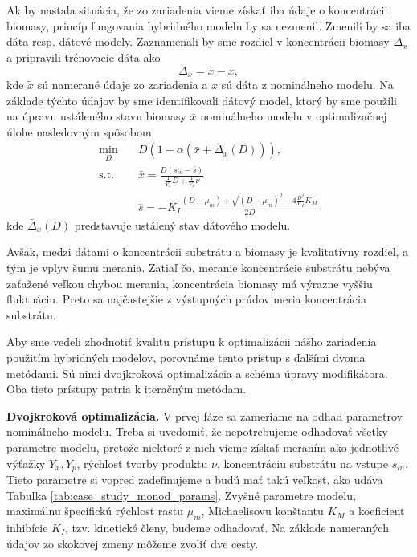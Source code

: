 Ak by nastala situácia, že zo zariadenia vieme získať iba údaje o koncentrácii biomasy, princíp fungovania hybridného modelu by sa nezmenil. Zmenili by sa iba dáta resp. dátové modely. Zaznamenali by sme rozdiel v koncentrácii biomasy $ \Delta_{x} $ a pripravili trénovacie dáta ako
\begin{equation}
	\Delta_{x} = \tilde{x} - x,
\end{equation} 
kde $ \tilde{x} $ sú namerané údaje zo zariadenia a $ x $ sú dáta z nominálneho modelu. Na základe týchto údajov by sme identifikovali dátový model, ktorý by sme použili na úpravu ustáleného stavu biomasy $ \bar{x} $ nominálneho modelu v optimalizačnej úlohe nasledovným spôsobom
\begin{equation}
\label{eq:hybrid_opt_bio}
	\begin{split}
		\min_{D} &\quad D\left(1-\alpha\left(\bar{x}+\bar{\Delta}_{x}(D)\right)\right), \\
		\text{s.t.} &\quad \bar{x} = \frac{D\left(s_{in}-\bar{s}\right)}{\frac{1}{Y_{x}}D + \frac{1}{Y_{x}}\nu} \\
		&\quad \bar{s} = -K_{I}\frac{\left(D-\mu_{m}\right) + \sqrt{\left(D-\mu_{m}\right)^2 - 4\frac{D^2}{K_{I}}K_{M}}}{2D}
	\end{split}
\end{equation}
kde $ \bar{\Delta}_{x}(D) $ predstavuje ustálený stav dátového modelu.

Avšak, medzi dátami o koncentrácii substrátu a biomasy je kvalitatívny rozdiel, a tým je vplyv šumu merania. Zatiaľ čo, meranie koncentrácie substrátu nebýva zaťažené veľkou chybou merania, koncentrácia biomasy má výrazne vyššiu fluktuáciu. Preto sa najčastejšie z výstupných prúdov meria koncentrácia substrátu. 

Aby sme vedeli zhodnotiť kvalitu prístupu k optimalizácii nášho zariadenia použitím hybridných modelov, porovnáme tento prístup s ďalšími dvoma metódami. Sú nimi dvojkroková optimalizácia a schéma úpravy modifikátora. Oba tieto prístupy patria k iteračným metódam.

\textbf{Dvojkroková optimalizácia.}
V prvej fáze sa zameriame na odhad parametrov nominálneho modelu. Treba si uvedomiť, že nepotrebujeme odhadovať všetky parametre modelu, pretože niektoré z nich vieme získať meraním ako jednotlivé výťažky $ Y_{x}, Y_{p} $, rýchlosť tvorby produktu $ \nu $, koncentráciu substrátu na vstupe $ s_{in} $. Tieto parametre si vopred zadefinujeme a budú mať takú veľkosť, ako udáva Tabuľka \ref{tab:case_study_monod_params}. Zvyšné parametre modelu, maximálnu špecifickú rýchlosť rastu $ \mu_{m} $, Michaelisovu konštantu $ K_{M} $ a koeficient inhibície $ K_{I} $, tzv. kinetické členy, budeme odhadovať. Na základe nameraných údajov zo skokovej zmeny môžeme zvoliť dve cesty.

